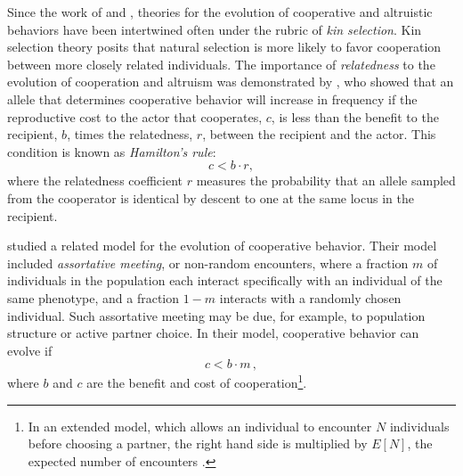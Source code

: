 \documentclass[12pt]{extarticle}
\begin{document}
Since the work of  \citet{hamilton1964genetical} and \citet{axelrod1981evolution}, theories for the evolution of cooperative and altruistic behaviors have been intertwined often under the rubric of \emph{kin selection}.
Kin selection theory posits that natural selection is more likely to favor cooperation between more closely related individuals.
The importance of \emph{relatedness} to the evolution of cooperation and altruism was demonstrated by \citet{hamilton1964genetical}, who showed that an allele that determines cooperative behavior will increase in frequency if the reproductive cost to the actor that cooperates, $c$, is less than the benefit to the recipient, $b$, times the relatedness, $r$, between the recipient and the actor.
This condition is  known as \emph{Hamilton's rule}:
\begin{equation} \label{eq:hamilton_rule}
c < b \cdot r,
\end{equation}
where the relatedness coefficient $r$ measures the probability that an allele sampled from the cooperator is identical by descent to one at the same locus in the recipient.

\citet{Eshel1982} studied a related model for the evolution of cooperative behavior.
Their model included \emph{assortative meeting}, or non-random encounters, where a fraction $m$ of individuals in the population each interact specifically with an individual of the same phenotype, and a fraction $1-m$ interacts  with a randomly chosen individual.  
Such assortative meeting may be due, for example, to population structure or active partner choice.
In their model, cooperative behavior can evolve if
\citep[eq.~3.2]{Eshel1982}
\begin{equation} \label{eq:eshel1982}
c < b \cdot m \,,
\end{equation}
where $b$ and $c$ are the benefit and cost of cooperation\footnote{In an extended model, which allows an individual to encounter $N$ individuals before choosing a partner, the right hand side is multiplied by $E[N]$, the expected number of encounters \citep[eq.~4.6]{Eshel1982}.
}. 
\end{document}

